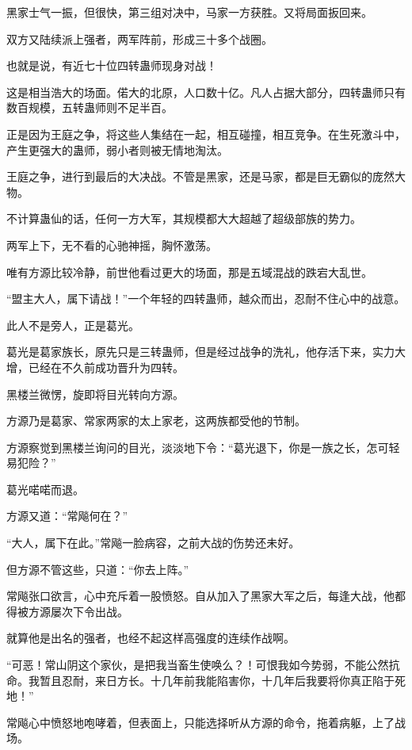 \begin{this_body}
黑家士气一振，但很快，第三组对决中，马家一方获胜。又将局面扳回来。

双方又陆续派上强者，两军阵前，形成三十多个战圈。

也就是说，有近七十位四转蛊师现身对战！

这是相当浩大的场面。偌大的北原，人口数十亿。凡人占据大部分，四转蛊师只有数百规模，五转蛊师则不足半百。

正是因为王庭之争，将这些人集结在一起，相互碰撞，相互竞争。在生死激斗中，产生更强大的蛊师，弱小者则被无情地淘汰。

王庭之争，进行到最后的大决战。不管是黑家，还是马家，都是巨无霸似的庞然大物。

不计算蛊仙的话，任何一方大军，其规模都大大超越了超级部族的势力。

两军上下，无不看的心驰神摇，胸怀激荡。

唯有方源比较冷静，前世他看过更大的场面，那是五域混战的跌宕大乱世。

“盟主大人，属下请战！”一个年轻的四转蛊师，越众而出，忍耐不住心中的战意。

此人不是旁人，正是葛光。

葛光是葛家族长，原先只是三转蛊师，但是经过战争的洗礼，他存活下来，实力大增，已经在不久前成功晋升为四转。

黑楼兰微愣，旋即将目光转向方源。

方源乃是葛家、常家两家的太上家老，这两族都受他的节制。

方源察觉到黑楼兰询问的目光，淡淡地下令：“葛光退下，你是一族之长，怎可轻易犯险？”

葛光喏喏而退。

方源又道：“常飚何在？”

“大人，属下在此。”常飚一脸病容，之前大战的伤势还未好。

但方源不管这些，只道：“你去上阵。”

常飚张口欲言，心中充斥着一股愤怒。自从加入了黑家大军之后，每逢大战，他都得被方源屡次下令出战。

就算他是出名的强者，也经不起这样高强度的连续作战啊。

“可恶！常山阴这个家伙，是把我当畜生使唤么？！可恨我如今势弱，不能公然抗命。我暂且忍耐，来日方长。十几年前我能陷害你，十几年后我要将你真正陷于死地！”

常飚心中愤怒地咆哮着，但表面上，只能选择听从方源的命令，拖着病躯，上了战场。

\end{this_body}

